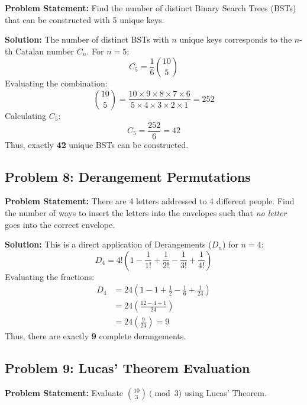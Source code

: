 \documentclass[10pt,journal,compsoc,onecolumn]{IEEEtran}
\begin{document}
\textbf{Problem Statement:}
Find the number of distinct Binary Search Trees (BSTs) that can be constructed with 5 unique keys.

\textbf{Solution:}
The number of distinct BSTs with $n$ unique keys corresponds to the $n$-th Catalan number $C_n$.
For $n = 5$:
\begin{equation}
C_5 = \frac{1}{6} \binom{10}{5}
\end{equation}
Evaluating the combination:
\begin{equation}
\binom{10}{5} = \frac{10 \times 9 \times 8 \times 7 \times 6}{5 \times 4 \times 3 \times 2 \times 1} = 252
\end{equation}
Calculating $C_5$:
\begin{equation}
C_5 = \frac{252}{6} = 42
\end{equation}
Thus, exactly \textbf{42} unique BSTs can be constructed.

\subsection{Problem 8: Derangement Permutations}

\textbf{Problem Statement:}
There are 4 letters addressed to 4 different people. Find the number of ways to insert the letters into the envelopes such that \emph{no letter} goes into the correct envelope.

\textbf{Solution:}
This is a direct application of Derangements ($D_n$) for $n=4$:
\begin{equation}
D_4 = 4! \left( 1 - \frac{1}{1!} + \frac{1}{2!} - \frac{1}{3!} + \frac{1}{4!} \right)
\end{equation}
Evaluating the fractions:
\begin{align}
D_4 &= 24 \left( 1 - 1 + \frac{1}{2} - \frac{1}{6} + \frac{1}{24} \right) \\
&= 24 \left( \frac{12 - 4 + 1}{24} \right) \\
&= 24 \left( \frac{9}{24} \right) = 9
\end{align}
Thus, there are exactly \textbf{9} complete derangements.

\subsection{Problem 9: Lucas' Theorem Evaluation}

\textbf{Problem Statement:}
Evaluate $\binom{10}{3} \pmod 3$ using Lucas' Theorem.
\end{document}
